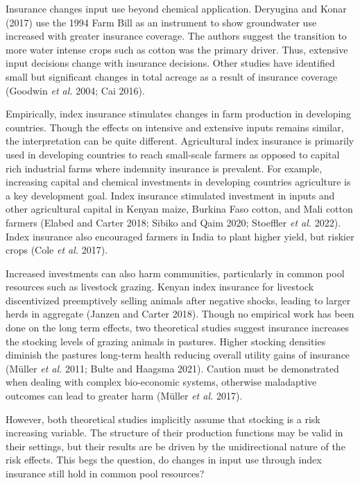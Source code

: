 \documentclass[
  letterpaper,
  DIV=11,
  numbers=noendperiod]{scrartcl}
\theoremstyle{plain}
\theoremstyle{plain}
\theoremstyle{remark}
\begin{document}
Insurance changes input use beyond chemical application. Deryugina and
Konar (2017) use the 1994 Farm Bill as an instrument to show groundwater
use increased with greater insurance coverage. The authors suggest the
transition to more water intense crops such as cotton was the primary
driver. Thus, extensive input decisions change with insurance decisions.
Other studies have identified small but significant changes in total
acreage as a result of insurance coverage (Goodwin \emph{et al.} 2004;
Cai 2016).

Empirically, index insurance stimulates changes in farm production in
developing countries. Though the effects on intensive and extensive
inputs remains similar, the interpretation can be quite different.
Agricultural index insurance is primarily used in developing countries
to reach small-scale farmers as opposed to capital rich industrial farms
where indemnity insurance is prevalent. For example, increasing capital
and chemical investments in developing countries agriculture is a key
development goal. Index insurance stimulated investment in inputs and
other agricultural capital in Kenyan maize, Burkina Faso cotton, and
Mali cotton farmers (Elabed and Carter 2018; Sibiko and Qaim 2020;
Stoeffler \emph{et al.} 2022). Index insurance also encouraged farmers
in India to plant higher yield, but riskier crops (Cole \emph{et al.}
2017).

Increased investments can also harm communities, particularly in common
pool resources such as livestock grazing. Kenyan index insurance for
livestock discentivized preemptively selling animals after negative
shocks, leading to larger herds in aggregate (Janzen and Carter 2018).
Though no empirical work has been done on the long term effects, two
theoretical studies suggest insurance increases the stocking levels of
grazing animals in pastures. Higher stocking densities diminish the
pastures long-term health reducing overall utility gains of insurance
(Müller \emph{et al.} 2011; Bulte and Haagsma 2021). Caution must be
demonstrated when dealing with complex bio-economic systems, otherwise
maladaptive outcomes can lead to greater harm (Müller \emph{et al.}
2017).

However, both theoretical studies implicitly assume that stocking is a
risk increasing variable. The structure of their production functions
may be valid in their settings, but their results are be driven by the
unidirectional nature of the risk effects. This begs the question, do
changes in input use through index insurance still hold in common pool
resources?
\end{document}
